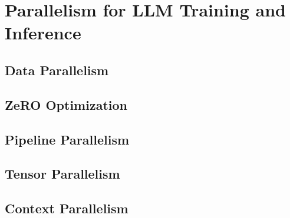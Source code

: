 
\section{Parallelism for LLM Training and Inference}



\subsection{Data Parallelism}


\subsection{ZeRO Optimization}


\subsection{Pipeline Parallelism}


\subsection{Tensor Parallelism}


\subsection{Context Parallelism}

